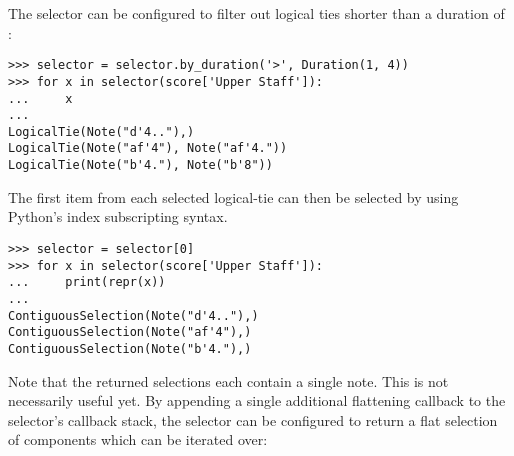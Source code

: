 \noindent The selector can be configured to filter out logical ties shorter
than a duration of :

\begin{comment}
<abjad>
selector = selector.by_duration('>', Duration(1, 4))
for x in selector(score['Upper Staff']):
    x

</abjad>
\end{comment}

\begin{abjadbookoutput}
\begin{singlespacing}
\vspace{-0.5\baselineskip}
\begin{verbatim}
>>> selector = selector.by_duration('>', Duration(1, 4))
>>> for x in selector(score['Upper Staff']):
...     x
...
LogicalTie(Note("d'4.."),)
LogicalTie(Note("af'4"), Note("af'4."))
LogicalTie(Note("b'4."), Note("b'8"))
\end{verbatim}
\end{singlespacing}
\end{abjadbookoutput}

\noindent The first item from each selected logical-tie can then be selected by
using Python's index subscripting syntax.

\begin{comment}
<abjad>
selector = selector[0]
for x in selector(score['Upper Staff']):
    print(repr(x))

</abjad>
\end{comment}

\begin{abjadbookoutput}
\begin{singlespacing}
\vspace{-0.5\baselineskip}
\begin{verbatim}
>>> selector = selector[0]
>>> for x in selector(score['Upper Staff']):
...     print(repr(x))
...
ContiguousSelection(Note("d'4.."),)
ContiguousSelection(Note("af'4"),)
ContiguousSelection(Note("b'4."),)
\end{verbatim}
\end{singlespacing}
\end{abjadbookoutput}

\noindent Note that the returned selections each contain a single note. This is
not necessarily useful yet. By appending a single additional flattening
callback to the selector's callback stack, the selector can be configured to
return a flat selection of components which can be iterated over:

